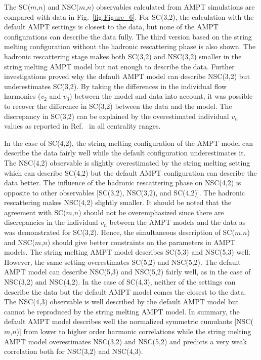 The SC($m$,$n$) and NSC($m$,$n$) observables calculated from AMPT simulations are compared with data in Fig.~\ref{fig:Figure_6}.
For SC(3,2), the calculation with the default AMPT settings is closest to the data, but none of the AMPT configurations can describe the data fully. 
The third version based on the string melting configuration without the hadronic rescattering phase is also shown.
The hadronic rescattering stage makes both SC(3,2) and NSC(3,2) smaller in the string melting AMPT model but not enough to describe the data.
Further investigations proved why the default AMPT model can describe NSC(3,2) but underestimates SC(3,2). By taking the differences in the individual flow harmonics ($v_2$ and $v_3$) between the model and data into account, it was possible to recover the difference in SC(3,2) between the data and the model. The discrepancy in SC(3,2) can be explained by the overestimated individual $v_n$ values as reported in Ref.~\cite{Adam:2016nfo} in all centrality ranges. 

In the case of SC(4,2), the string melting configuration of the AMPT model can describe the data fairly well while the default configuration underestimates it.
The NSC(4,2) observable is slightly overestimated by the string melting setting which can describe SC(4,2) but the default AMPT configuration can describe the data better.
The influence of the hadronic rescattering phase on NSC(4,2) is opposite to other observables [SC(3,2), NSC(3,2), and SC(4,2)]. The hadronic rescattering makes NSC(4,2) slightly smaller.
It should be noted that the agreement with SC($m$,$n$) should not be overemphasized since there are discrepancies in the individual $v_n$ between the AMPT models and the data as was demonstrated for SC(3,2).
Hence, the simultaneous description of SC($m$,$n$) and NSC($m$,$n$) should give better constraints on the parameters in AMPT models.
The string melting AMPT model describes SC(5,3) and NSC(5,3) well. However, the same setting overestimates SC(5,2) and NSC(5,2). 
The default AMPT model can describe NSC(5,3) and NSC(5,2) fairly well, as in the case of NSC(3,2) and NSC(4,2).
In the case of SC(4,3), neither of the settings can describe the data but the default AMPT model comes the closest to the data. 
The NSC(4,3) observable is well described by the default AMPT model but cannot be reproduced by the string melting AMPT model.
In summary, the default AMPT model describes well the normalized symmetric cumulants [NSC($m$,$n$)] from lower to higher order harmonic correlations while the string melting AMPT model overestimates NSC(3,2) and NSC(5,2) and predicts a very weak correlation both for NSC(3,2) and NSC(4,3). 

